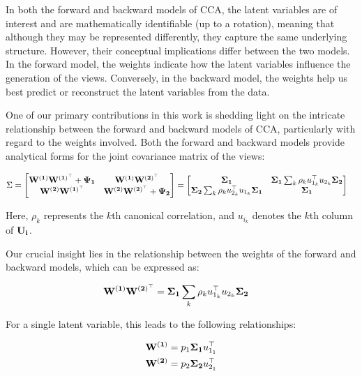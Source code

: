In both the forward and backward models of CCA, the latent variables are of interest and are mathematically identifiable (up to a rotation), meaning that although they may be represented differently, they capture the same underlying structure.
However, their conceptual implications differ between the two models.
In the forward model, the weights indicate how the latent variables influence the generation of the views.
Conversely, in the backward model, the weights help us best predict or reconstruct the latent variables from the data.

One of our primary contributions in this work is shedding light on the intricate relationship between the forward and backward models of CCA, particularly with regard to the weights involved.
Both the forward and backward models provide analytical forms for the joint covariance matrix of the views:

\begin{align}
    \Sigma &= \begin{bmatrix}
        \bold{W^{(1)}W^{(1)^{\top}}} + \bold{\Psi_1} & \bold{W^{(1)}W^{(2)^{\top}}} \\
        \bold{W^{(2)}W^{(1)^{\top}}} & \bold{W^{(2)}W^{(2)^{\top}}} + \bold{\Psi_2}
    \end{bmatrix} = \begin{bmatrix}
        \bold{\Sigma_1} & \bold{\Sigma_1}\sum_k \rho_k u_{1_k}^\top u_{2_k} \bold{\Sigma_2}  \\
        \bold{\Sigma_2}\sum_k \rho_k u_{2_k}^\top u_{1_k} \bold{\Sigma_1} & \bold{\Sigma_1}
    \end{bmatrix}
\end{align}

Here, $\rho_k$ represents the $k$th canonical correlation, and $u_{i_k}$ denotes the $k$th column of $\bold{U_i}$.

Our crucial insight lies in the relationship between the weights of the forward and backward models, which can be expressed as:

\begin{align}
    \bold{W^{(1)}W^{(2)^{\top}}} &= \bold{\Sigma_1}\sum_k \rho_k u_{1_k}^\top u_{2_k} \bold{\Sigma_2}
\end{align}

For a single latent variable, this leads to the following relationships:

\begin{align}
    \bold{W^{(1)}} &= p_1\bold{\Sigma_1} u_{1_1}^\top \\
    \bold{W^{(2)}} &= p_2\bold{\Sigma_2} u_{2_1}^\top
\end{align}

